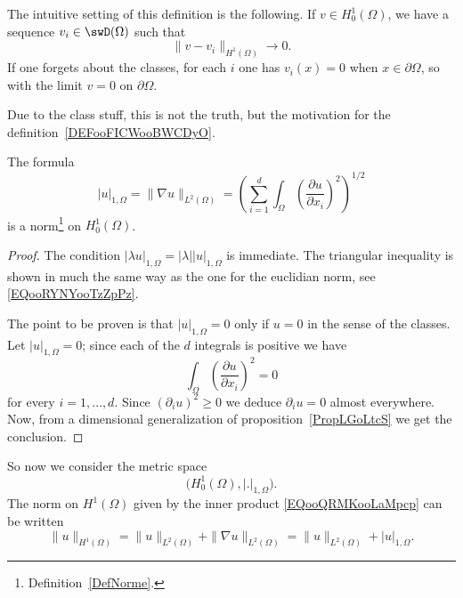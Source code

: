 \begin{normaltext}
	The intuitive setting of this definition is the following. If \( v\in H^1_0(\Omega)\), we have a sequence \( v_i\in \swD(\Omega)\) such that
	\begin{equation}
		\| v-v_i \|_{H^1(\Omega)}\to 0.
	\end{equation}
	If one forgets about the classes, for each \( i\) one has \( v_i(x)=0\) when \( x\in\partial\Omega\), so with the limit \( v=0\) on \( \partial\Omega\).

	Due to the class stuff, this is not the truth, but the motivation for the definition~\ref{DEFooFICWooBWCDyO}.
\end{normaltext}

\begin{lemma}
	The formula
	\begin{equation}
		| u |_{1,\Omega}=\| \nabla u \|_{L^2(\Omega)}=\left( \sum_{i=1}^d\int_{\Omega}\left( \frac{ \partial u }{ \partial x_i } \right)^2 \right)^{1/2}
	\end{equation}
	is a norm\footnote{Definition~\ref{DefNorme}.} on \( H_0^1(\Omega)\).
\end{lemma}

\begin{proof}
	The condition \( | \lambda u |_{1,\Omega}=| \lambda | | u |_{1,\Omega}\) is immediate. The triangular inequality is shown in much the same way as the one for the euclidian norm, see \eqref{EQooRYNYooTzZpPz}.

	The point to be proven is that \( | u |_{1,\Omega}=0\) only if \( u=0\) in the sense of the classes. Let \( | u |_{1,\Omega}=0\); since each of the \( d\) integrals is positive we have
	\begin{equation}
		\int_{\Omega}\left( \frac{ \partial u }{ \partial x_i } \right)^2=0
	\end{equation}
	for every \( i=1,\ldots, d\). Since \( (\partial_i u)^2\geq 0\) we deduce \( \partial_iu=0\) almost everywhere. Now, from a dimensional generalization of proposition~\ref{PropLGoLtcS} we get the conclusion.
\end{proof}

So now we consider the metric space
\begin{equation}
	\big( H^1_0(\Omega),| . |_{1,\Omega} \big).
\end{equation}
The norm on \( H^1(\Omega)\) given by the inner product \eqref{EQooQRMKooLaMpcp} can be written
\begin{equation}
	\| u \|_{H^1(\Omega)}=\| u \|_{L^2(\Omega)}+\| \nabla u \|_{L^2(\Omega)}=\| u \|_{L^2(\Omega)}+| u |_{1,\Omega}.
\end{equation}

